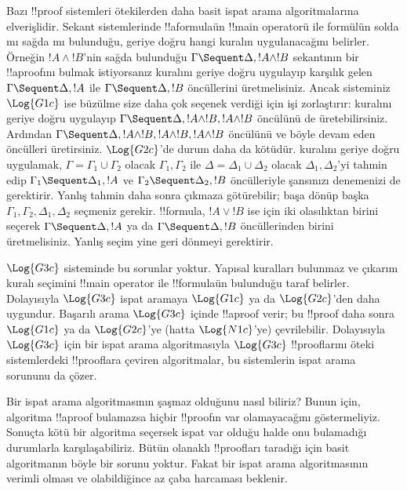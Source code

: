\documentclass[../../../include/open-logic-section]{subfiles}
\begin{document}
Bazı !!{proof} sistemleri ötekilerden daha basit ispat arama algoritmalarına
elverişlidir. Sekant sistemlerinde !!a{formula}{}ün !!{main operator}{}ü ile
formülün solda mı sağda mı bulunduğu, geriye doğru hangi kuralın uygulanacağını
belirler. Örneğin $!A \land !B$'nin sağda bulunduğu
$\Gamma \Sequent \Delta, !A \land !B$ sekantının bir !!a{proof}{}ını bulmak
istiyorsanız \RightR{\land} kuralını geriye doğru uygulayıp karşılık gelen
$\Gamma \Sequent \Delta, !A$ ile $\Gamma \Sequent \Delta, !B$ öncüllerini
üretmelisiniz. Ancak sisteminiz $\Log{G1c}$ ise büzülme size daha çok seçenek
verdiği için işi zorlaştırır: \RightR{\Contraction} kuralını geriye doğru
uygulayıp $\Gamma \Sequent \Delta, !A \land !B, !A \land !B$ öncülünü de
üretebilirsiniz. Ardından
$\Gamma \Sequent \Delta, !A \land !B, !A \land !B, !A \land !B$ öncülünü
ve böyle devam eden öncülleri üretirsiniz. $\Log{G2c}$'de durum daha da
kötüdür. \RightR{\land} kuralını geriye doğru uygulamak, $\Gamma =
\Gamma_1 \cup \Gamma_2$ olacak $\Gamma_1,\Gamma_2$ ile $\Delta =
\Delta_1 \cup \Delta_2$ olacak $\Delta_1,\Delta_2$'yi tahmin edip
$\Gamma_1 \Sequent \Delta_1, !A$ ve $\Gamma_2 \Sequent \Delta_2, !B$
öncülleriyle şansınızı denemenizi de gerektirir. Yanlış tahmin daha sonra
çıkmaza götürebilir; başa dönüp başka $\Gamma_1,\Gamma_2,\Delta_1,\Delta_2$
seçmeniz gerekir. !!{formula}, $!A \lor !B$ ise \RightR{\lor} için iki
olasılıktan birini seçerek $\Gamma \Sequent \Delta, !A$ ya da
$\Gamma \Sequent \Delta, !B$ öncüllerinden birini üretmelisiniz. Yanlış
seçim yine geri dönmeyi gerektirir.

$\Log{G3c}$ sisteminde bu sorunlar yoktur. Yapısal kuralları bulunmaz ve
çıkarım kuralı seçimini !!{main operator} ile !!{formula}{}ün bulunduğu taraf
belirler. Dolayısıyla $\Log{G3c}$ ispat aramaya $\Log{G1c}$ ya da
$\Log{G2c}$'den daha uygundur. Başarılı arama $\Log{G3c}$ içinde !!a{proof}
verir; bu !!{proof} daha sonra $\Log{G1c}$ ya da $\Log{G2c}$'ye (hatta
$\Log{N1c}$'ye) çevrilebilir. Dolayısıyla $\Log{G3c}$ için bir ispat arama
algoritmasıyla $\Log{G3c}$ !!{proof}{}larını öteki sistemlerdeki !!{proof}{}lara
çeviren algoritmalar, bu sistemlerin ispat arama sorununu da çözer.

Bir ispat arama algoritmasının şaşmaz olduğunu nasıl biliriz? Bunun için,
algoritma !!a{proof} bulamazsa hiçbir !!{proof}{}ın var olamayacağını
göstermeliyiz. Sonuçta kötü bir algoritma seçersek ispat var olduğu halde onu
bulamadığı durumlarla karşılaşabiliriz. Bütün olanaklı !!{proof}{}ları taradığı
için basit algoritmanın böyle bir sorunu yoktur. Fakat bir ispat arama
algoritmasının verimli olması ve olabildiğince az çaba harcaması beklenir.
\end{document}
